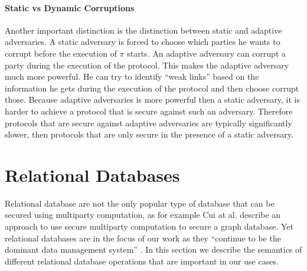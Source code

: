 \paragraph{Static vs Dynamic Corruptions}
Another important distinction is the distinction between static and adaptive adversaries. A static adversary is forced to choose which parties he wants to corrupt before the execution of $ \pi $ starts. An adaptive adversary can corrupt a party during the execution of the protocol. This makes the adaptive adversary much more powerful. He can try to identify ``weak links'' based on the information he gets during the execution of the protocol and then choose corrupt those. Because adaptive adversaries is more powerful then a static adversary, it is harder to achieve a protocol that is secure against such an adversary. Therefore protocols that are secure against adaptive adversaries are typically significantly slower, then protocols that are only secure in the presence of a static adversary.


\section{Relational Databases}
\label{Databases}
Relational database are not the only popular type of database that can be secured using multiparty computation, as for example Cui at al. \cite{cui2020secure} describe an approach to use secure multiparty computation to secure a graph database. Yet relational databases are in the focus of our work as they ``continue to be the dominant data management system'' \cite{Archer2018FromKT}.  In this section we describe the semantics of different relational database operations that are important in our use cases. %


